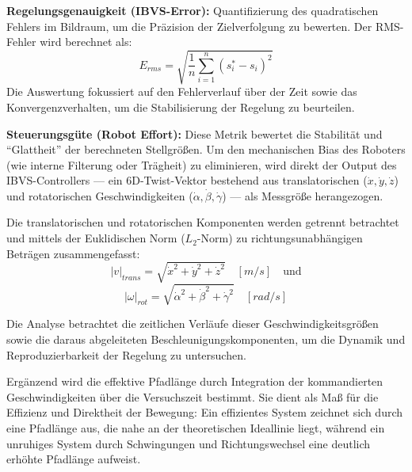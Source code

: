 \begin{listNorm}
    \item \textbf{Regelungsgenauigkeit (\ac{IBVS}-Error):} Quantifizierung des quadratischen Fehlers im Bildraum, um die Präzision der Zielverfolgung zu bewerten. Der RMS-Fehler wird berechnet als:
    \begin{equation}
        E_{rms} = \sqrt{\frac{1}{n} \sum_{i=1}^{n} (s_i^* - s_i)^2}
    \end{equation}
    Die Auswertung fokussiert auf den Fehlerverlauf über der Zeit sowie das Konvergenzverhalten, um die Stabilisierung der Regelung zu beurteilen.

    \newpage
    \item \textbf{Steuerungsgüte (Robot Effort):} 
    Diese Metrik bewertet die Stabilität und \enquote{Glattheit} der berechneten Stellgrößen. Um den mechanischen Bias des Roboters (wie interne Filterung oder Trägheit) zu eliminieren, wird direkt der Output des \ac{IBVS}-Controllers — ein 6D-Twist-Vektor bestehend aus translatorischen ($\dot{x}, \dot{y}, \dot{z}$) und rotatorischen Geschwindigkeiten ($\dot{\alpha}, \dot{\beta}, \dot{\gamma}$) — als Messgröße herangezogen.

    Die translatorischen und rotatorischen Komponenten werden getrennt betrachtet und mittels der Euklidischen Norm ($L_2$-Norm) zu richtungsunabhängigen Beträgen zusammengefasst:
    \begin{equation}
        \left|v\right|_{trans} = \sqrt{\dot{x}^2 + \dot{y}^2 + \dot{z}^2} \quad \left[m/s\right] \quad \text{und}
    \end{equation}
    \begin{equation}
        \left|\omega\right|_{rot} = \sqrt{\dot{\alpha}^2 + \dot{\beta}^2 + \dot{\gamma}^2} \quad \left[rad/s\right]
    \end{equation}

    Die Analyse betrachtet die zeitlichen Verläufe dieser Geschwindigkeitsgrößen sowie die daraus abgeleiteten Beschleunigungskomponenten, um die Dynamik und Reproduzierbarkeit der Regelung zu untersuchen.

    Ergänzend wird die effektive Pfadlänge durch Integration der kommandierten Geschwindigkeiten über die Versuchszeit bestimmt. Sie dient als Maß für die Effizienz und Direktheit der Bewegung: Ein effizientes System zeichnet sich durch eine Pfadlänge aus, die nahe an der theoretischen Ideallinie liegt, während ein unruhiges System durch Schwingungen und Richtungswechsel eine deutlich erhöhte Pfadlänge aufweist.
\end{listNorm}


